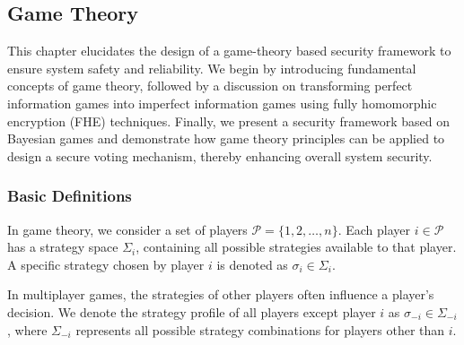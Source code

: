 \documentclass[11pt]{article}
\begin{document}
\subsection{Game Theory}
\label{sec:game_theory}
This chapter elucidates the design of a game-theory\cite{fudenberg1991game} based security framework to ensure system safety and reliability. We begin by introducing fundamental concepts of game theory, followed by a discussion on transforming perfect information games into imperfect information games using fully homomorphic encryption (FHE) techniques. Finally, we present a security framework based on Bayesian games and demonstrate how game theory principles can be applied to design a secure voting mechanism, thereby enhancing overall system security.

\subsubsection{Basic Definitions}

In game theory, we consider a set of players $\mathcal{P} = \{1,2,\ldots,n\}$. Each player $i \in \mathcal{P}$ has a strategy space $\Sigma_i$, containing all possible strategies available to that player. A specific strategy chosen by player $i$ is denoted as $\sigma_i \in \Sigma_i$.

In multiplayer games, the strategies of other players often influence a player's decision. We denote the strategy profile of all players except player $i$ as $\sigma_{-i} \in \Sigma_{-i}$, where $\Sigma_{-i}$ represents all possible strategy combinations for players other than $i$.
\end{document}
